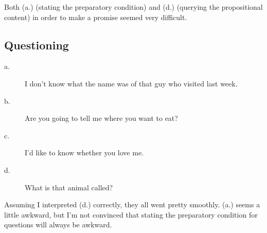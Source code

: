 \documentclass[12pt]{article}
\begin{document}
Both (a.) (stating the preparatory condition) and (d.) (querying the
propositional content) in order to make a promise seemed very difficult.

\subsection*{Questioning}
\begin{description}
\item[a.] I don't know what the name was of that guy who visited last
week.
\item[b.] Are you going to tell me where you want to eat?
\item[c.] I'd like to know whether you love me.
\item[d.] What is that animal called?
\end{description}

Assuming I interpreted (d.) correctly, they all went pretty smoothly.
(a.) seems a little awkward, but I'm not convinced that stating the
preparatory condition for questions will always be awkward.
\end{document}
